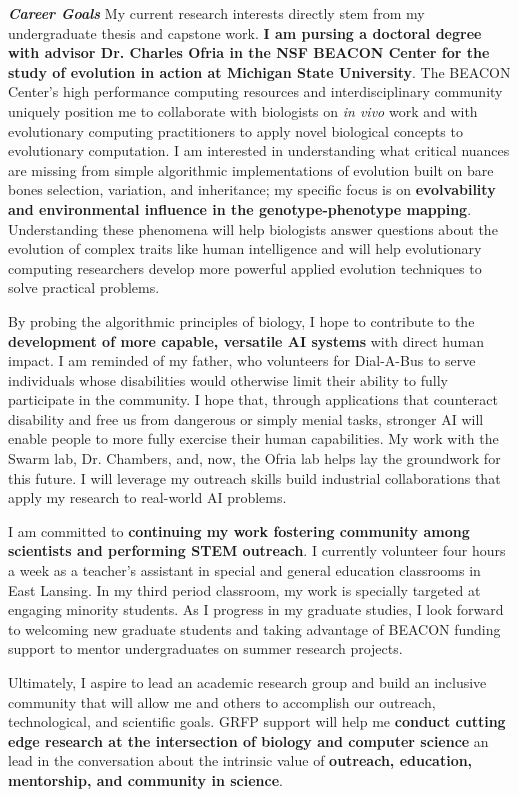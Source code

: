 \noindent
\textit{\textbf{Career Goals}}
My current research interests directly stem from my undergraduate thesis and capstone work.
\textbf{I am pursing a doctoral degree with advisor Dr. Charles Ofria in the NSF BEACON Center for the study of evolution in action at Michigan State University}.
The BEACON Center's high performance computing resources and interdisciplinary community uniquely position me to collaborate with biologists on \textit{in vivo} work and with evolutionary computing practitioners to apply novel biological concepts to evolutionary computation.
I am interested in understanding what critical nuances are missing from simple algorithmic implementations of evolution built on bare bones selection, variation, and inheritance;
my specific focus is on \textbf{evolvability and environmental influence in the genotype-phenotype mapping}.
Understanding these phenomena will help biologists answer questions about the evolution of complex traits like human intelligence and will help evolutionary computing researchers develop more powerful applied evolution techniques to solve practical problems.

By probing the algorithmic principles of biology, I hope to contribute to the \textbf{development of more capable, versatile AI systems} with direct human impact.
I am reminded of my father, who volunteers for Dial-A-Bus to serve individuals whose disabilities would otherwise limit their ability to fully participate in the community.
I hope that, through applications that counteract disability and free us from dangerous or simply menial tasks, stronger AI will enable people to more fully exercise their human capabilities.
My work with the Swarm lab, Dr. Chambers, and, now, the Ofria lab helps lay the groundwork for this future.
I will leverage my outreach skills build industrial collaborations that apply my research to real-world AI problems.

I am committed to \textbf{continuing my work fostering community among scientists and performing STEM outreach}.
I currently volunteer four hours a week as a teacher's assistant in special and general education classrooms in East Lansing.
In my third period classroom, my work is specially targeted at engaging minority students.
As I progress in my graduate studies, I look forward to welcoming new graduate students and taking advantage of BEACON funding support to mentor undergraduates on summer research projects.

Ultimately, I aspire to lead an academic research group and build an inclusive community that will allow me and others to accomplish our outreach, technological, and scientific goals.
GRFP support will help me \textbf{conduct cutting edge research at the intersection of biology and computer science} an lead in the conversation about the intrinsic value of \textbf{outreach, education, mentorship, and community in science}.
